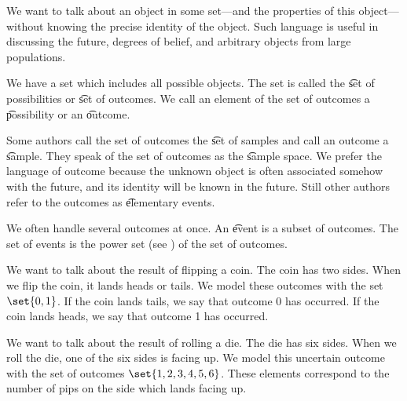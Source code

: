 

We want to talk about an object in some set---and the properties of this object---without knowing the precise identity of the object.
Such language is useful in discussing the future, degrees of belief, and arbitrary objects from large populations.


We have a set which includes all possible objects.
The set is called the \t{set of possibilities} or \t{set of outcomes}.
We call an element of the set of outcomes a \t{possibility} or an \t{outcome}.

Some authors call the set of outcomes the \t{set of samples} and call an outcome a \t{sample}.
They speak of the set of outcomes as the \t{sample space}.
We prefer the language of outcome because the unknown object is often associated somehow with the future, and its identity will be known in the future.
Still other authors refer to the outcomes as \t{elementary events}.

We often handle several outcomes at once.
An \t{event} is a subset of outcomes.
The set of events is the power set (see ) of the set of outcomes.


We want to talk about the result of flipping a coin.
The coin has two sides.
When we flip the coin, it lands heads or tails.
We model these outcomes with the set $\set{0, 1}$.
If the coin lands tails, we say that outcome 0 has occurred.
If the coin lands heads, we say that outcome 1 has occurred.


We want to talk about the result of rolling a die.
The die has six sides.
When we roll the die, one of the six sides is facing up.
We model this uncertain outcome with the set of outcomes $\set{1, 2, 3, 4, 5, 6}$.
These elements correspond to the number of pips on the side which lands facing up.

